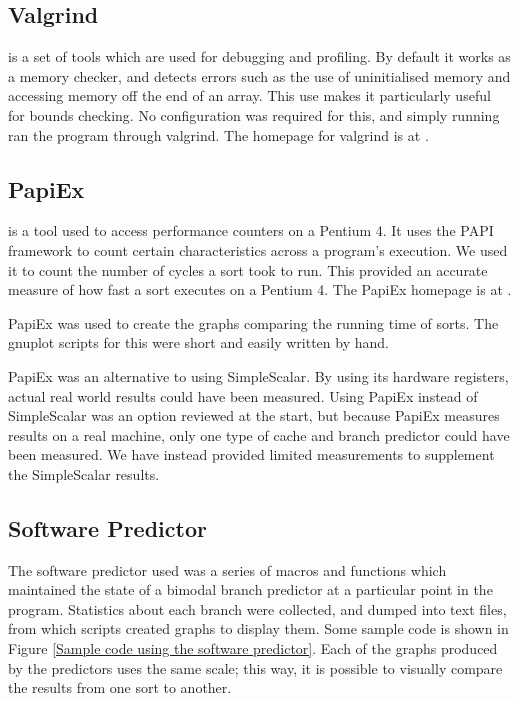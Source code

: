 \subsection{Valgrind}
\label{Valgrind}
 is a set of tools which are used for debugging and profiling.  By
default it works as a memory checker, and detects errors such as the use of
uninitialised memory and accessing memory off the end of an array. This use
makes it particularly useful for bounds checking. No configuration was required
for this, and simply running  ran the program through
valgrind. The homepage for valgrind is at .

\subsection{PapiEx}
 is a tool used to access performance counters on a Pentium 4. It
uses the PAPI framework to count certain characteristics across a program's
execution. We used it to count the number of cycles a sort took to run. This
provided an accurate measure of how fast a sort executes on a Pentium 4. The
PapiEx homepage is at .

PapiEx was used to create the graphs comparing the running time of sorts.
The gnuplot scripts for this were short and easily written by hand.

PapiEx was an alternative to using SimpleScalar. By using its hardware
registers, actual real world results could have been measured. Using PapiEx
instead of SimpleScalar was an option reviewed at the start, but because PapiEx
measures results on a real machine, only one type of cache and branch predictor
could have been measured. We have instead provided limited measurements to
supplement the SimpleScalar results.

\subsection{Software Predictor}
The software predictor used was a series of macros and functions which
maintained the state of a bimodal branch predictor at a particular point in the
program. Statistics about each branch were collected, and dumped into text
files, from which scripts created graphs to display them. Some sample code is
shown in Figure \ref{Sample code using the software predictor}. Each of the
graphs produced by the predictors uses the same scale; this way, it is possible
to visually compare the results from one sort to another.

